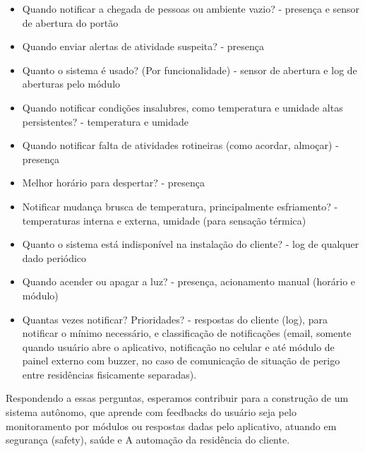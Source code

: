 \begin{itemize}
	
\item Quando notificar a chegada de pessoas ou ambiente vazio? - presença e sensor de abertura do portão
\item Quando enviar alertas de atividade suspeita? - presença
\item Quanto o sistema é usado? (Por funcionalidade) - sensor de abertura e log de aberturas pelo módulo
\item Quando notificar condições insalubres, como temperatura e umidade altas persistentes? - temperatura e umidade
\item Quando notificar falta de atividades rotineiras (como acordar, almoçar) - presença
\item Melhor horário para despertar? - presença
\item Notificar mudança brusca de temperatura, principalmente esfriamento? - temperaturas interna e externa, umidade (para sensação térmica)
\item Quanto o sistema está indisponível na instalação do cliente? - log de qualquer dado periódico
\item Quando acender ou apagar a luz? - presença, acionamento manual (horário e módulo)
\item Quantas vezes notificar? Prioridades? - respostas do cliente (log), para notificar o mínimo necessário, e classificação de notificações (email, somente quando usuário abre o aplicativo, notificação no celular e até módulo de painel externo com buzzer, no caso de comunicação de situação de perigo entre residências fisicamente separadas).
\end{itemize}

Respondendo a essas perguntas, esperamos contribuir para a construção de um sistema autônomo, que aprende com feedbacks do usuário seja pelo monitoramento por módulos ou respostas dadas pelo aplicativo, atuando em segurança (safety), saúde e A
automação da residência do cliente.

